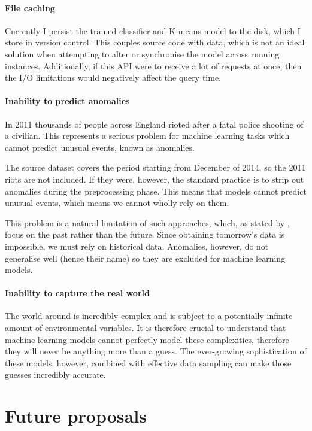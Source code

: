 \documentclass{article}
\begin{document}
	\paragraph{File caching}

	Currently I persist the trained classifier and K-means model to the disk, which I store in version control. This couples source code with data, which is not an ideal solution when attempting to alter or synchronise the model across running instances. Additionally, if this API were to receive a lot of requests at once, then the I/O limitations would negatively affect the query time.

	\paragraph{Inability to predict anomalies}

	In 2011 thousands of people across England rioted after a fatal police shooting of a civilian. This represents a serious problem for machine learning tasks which cannot predict unusual events, known as anomalies.

	The source dataset covers the period starting from December of 2014, so the 2011 riots are not included. If they were, however, the standard practice is to strip out anomalies during the preprocessing phase. This means that models cannot predict unusual events, which means we cannot wholly rely on them.

	This problem is a natural limitation of such approaches, which, as stated by \cite{neil}, focus on the past rather than the future. Since obtaining tomorrow's data is impossible, we must rely on historical data. Anomalies, however, do not generalise well (hence their name) so they are excluded for machine learning models.

	\paragraph{Inability to capture the real world}

	The world around is incredibly complex and is subject to a potentially infinite amount of environmental variables. It is therefore crucial to understand that machine learning models cannot perfectly model these complexities, therefore they will never be anything more than a guess. The ever-growing sophistication of these models, however, combined with effective data sampling can make those guesses incredibly accurate.

	\section{Future proposals}
\end{document}
